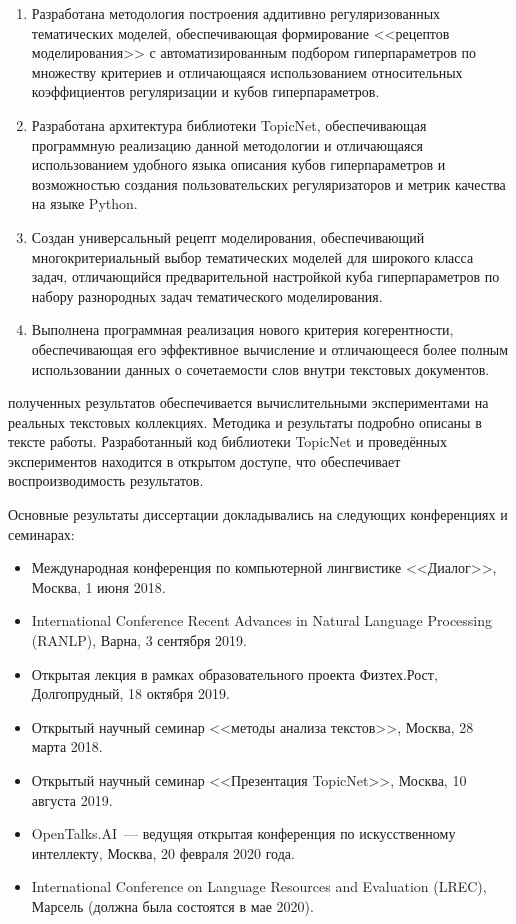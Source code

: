 {}
\begin{enumerate}[beginpenalty=10000] %
\item 
    Разработана методология построения аддитивно регуляризованных тематических моделей, обеспечивающая формирование <<рецептов моделирования>> с автоматизированным подбором гиперпараметров по множеству критериев и отличающаяся использованием относительных коэффициентов регуляризации и кубов гиперпараметров. 
\item 
    Разработана архитектура библиотеки TopicNet, обеспечивающая программную реализацию данной методологии и отличающаяся использованием удобного языка описания кубов гиперпараметров и возможностью создания пользовательских регуляризаторов и метрик качества на языке Python.
\item 
    Создан универсальный рецепт моделирования, обеспечивающий многокритериальный выбор тематических моделей для широкого класса задач, отличающийся предварительной настройкой куба гиперпараметров по набору разнородных задач тематического моделирования.    
\item 
    Выполнена программная реализация нового критерия когерентности, обеспечивающая его эффективное вычисление и отличающееся более полным использовании данных о сочетаемости слов внутри текстовых документов.
\end{enumerate}

{\reliability} полученных результатов обеспечивается вычислительными экспериментами на реальных текстовых коллекциях. Методика и результаты подробно описаны в тексте работы. Разработанный код библиотеки TopicNet и проведённых экспериментов находится в открытом доступе, что обеспечивает воспроизводимость результатов.  

{\probation}
Основные результаты диссертации докладывались на следующих конференциях и семинарах:
\begin{itemize}
    \item Международная конференция по компьютерной лингвистике <<Диалог>>, Москва, 1 июня 2018.
    \item International Conference Recent Advances in Natural Language Processing (RANLP), Варна, 3 сентября 2019.
    \item Открытая лекция в рамках образовательного проекта Физтех.Рост, Долгопрудный, 18 октября 2019.
    \item Открытый научный семинар <<методы анализа текстов>>, Москва, 28 марта 2018.
    \item Открытый научный семинар <<Презентация TopicNet>>, Москва, 10 августа 2019.
    \item OpenTalks.AI~--- ведущяя открытая конференция по искусственному интеллекту, Москва, 20 февраля 2020 года.
    \item International Conference on Language Resources and Evaluation (LREC), Марсель (должна была состоятся в мае 2020).
\end{itemize}


